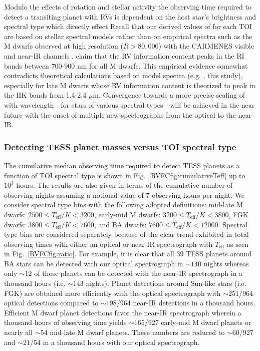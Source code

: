 Modulo the effects of rotation and stellar activity the observing time required to detect a transiting
planet with RVs is dependent on the host star's brightness and spectral type which directly effect  
Recall that our derived values of \sigRV{} for each TOI are based on stellar spectral models rather than on
empirical spectra such as the M dwarfs observed at high resolution ($R > 80,000$) with the CARMENES visible and
near-IR channels \citep{reiners18}. \cite{reiners18}
claim that the RV information content peaks in the RI bands
between 700-900 nm for all M dwarfs. This empirical evidence somewhat contradicts theoretical calculations
based on model spectra (e.g. \citealt{figueira16}, this study), especially for late M dwarfs whose RV
information content is theorized to peak in the HK bands from 1.4-2.4 $\mu$m. Convergence towards a more
precise scaling of \sigRV{} with wavelength---for stars of various spectral types---will be achieved in the
near future with the onset of multiple new spectrographs from the optical to the near-IR.


\subsubsection{Detecting TESS planet masses versus TOI spectral type}
The cumulative median observing time required to detect TESS planets as a function of TOI spectral type
is shown in Fig.~\ref{RVFCfig:cumulativeTeff} up to $10^3$ hours. The results are also given in terms of
the cumulative number of observing nights assuming a notional value of 7 observing hours per night. 
We consider spectral type bins with the following adopted definitions:
mid-late M dwarfs: $2500 \leq T_{\text{eff}}/K < 3200$,
early-mid M dwarfs: $3200 \leq T_{\text{eff}}/K < 3800$,
FGK dwarfs: $3800 \leq T_{\text{eff}}/K < 7600$, and
BA dwarfs: $7600 \leq T_{\text{eff}}/K < 12000$. Spectral type bins are considered separately
because of the clear trend exhibited in total observing times
with either an optical or near-IR spectrograph with $T_{\text{eff}}$ as seen in Fig.~\ref{RVFCfig:ratio}.
For example, it is clear that all 39 TESS planets around BA stars can be detected with our 
optical spectrograph in $\sim 140$ nights whereas only $\sim 12$ of those
planets can be detected with the near-IR spectrograph in a thousand hours (i.e. $\sim 143$ nights).
Planet detections around Sun-like
stars (i.e. FGK) are obtained more efficiently with the optical spectrograph with $\sim 251$/964 optical
detections compared to $\sim 198$/964 near-IR detections in a thousand hours.
Efficient M dwarf planet detections favor the near-IR
spectrograph wherein a thousand hours of observing time yields $\sim 165$/927 early-mid M dwarf planets
or nearly all $\sim 54$ mid-late M dwarf planets.
These numbers are reduced to $\sim 60$/927 and $\sim 21$/54 in a thousand hours with our 
optical spectrograph. \\

